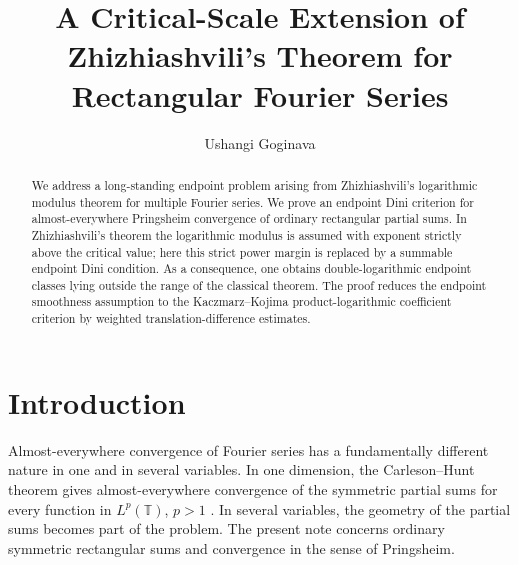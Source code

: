 \documentclass[11pt,reqno]{amsart}
\numberwithin{equation}{section}
\theoremstyle{plain}
\theoremstyle{definition}
\theoremstyle{remark}
\newcommand{\T}{\mathbb T}
\begin{document}
\title[A Critical-Scale Extension of Zhizhiashvili's Theorem]
{A Critical-Scale Extension of Zhizhiashvili's Theorem for Rectangular Fourier Series}
\author[U. Goginava]{Ushangi Goginava}
\address{Department of Mathematical Sciences, United Arab Emirates University, P.O. Box No. 15551, Al Ain, Abu Dhabi, United Arab Emirates}
\date{}

\begin{abstract}
We address a long-standing endpoint problem arising from Zhizhiashvili's logarithmic modulus theorem for multiple Fourier series. We prove an endpoint Dini criterion for almost-everywhere Pringsheim convergence of ordinary rectangular partial sums. In Zhizhiashvili's theorem the logarithmic modulus is assumed with exponent strictly above the critical value; here this strict power margin is replaced by a summable endpoint Dini condition. As a consequence, one obtains double-logarithmic endpoint classes lying outside the range of the classical theorem. The proof reduces the endpoint smoothness assumption to the Kaczmarz--Kojima product-logarithmic coefficient criterion by weighted translation-difference estimates.
\end{abstract}

\maketitle
\enlargethispage{8pt}

\section{Introduction}

Almost-everywhere convergence of Fourier series has a fundamentally different nature in one and in several variables. In one dimension, the Carleson--Hunt theorem gives almost-everywhere convergence of the symmetric partial sums for every function in $L^p(\T)$, $p>1$ \cite{Carleson1966,Hunt1968}. In several variables, the geometry of the partial sums becomes part of the problem. The present note concerns ordinary symmetric rectangular sums and convergence in the sense of Pringsheim.
\end{document}
